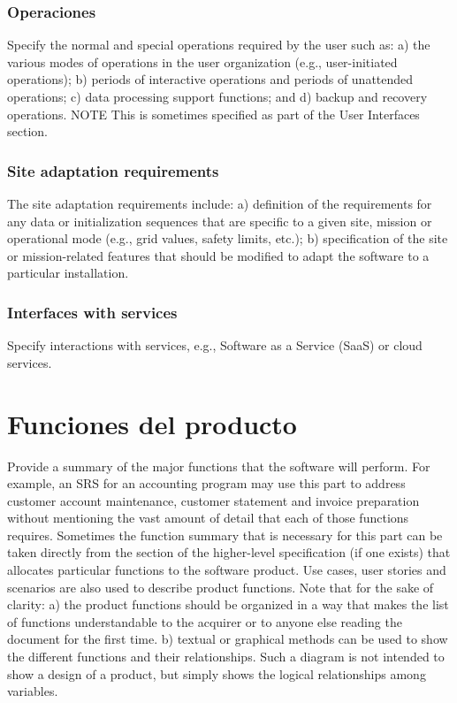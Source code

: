 \documentclass[12pt, a4paper, twoside]{article}
\begin{document}
\subsubsection{Operaciones}
Specify the normal and special operations required by the user such as:
a) the various modes of operations in the user organization (e.g., user-initiated operations);
b) periods of interactive operations and periods of unattended operations;
c) data processing support functions; and
d) backup and recovery operations.
NOTE This is sometimes specified as part of the User Interfaces section.

\subsubsection{Site adaptation requirements}
The site adaptation requirements include:
a) definition of the requirements for any data or initialization sequences that are specific to a given
site, mission or operational mode (e.g., grid values, safety limits, etc.);
b) specification of the site or mission-related features that should be modified to adapt the software
to a particular installation.

\subsubsection{Interfaces with services}
Specify interactions with services, e.g., Software as a Service (SaaS) or cloud services.


\section{Funciones del producto}
Provide a summary of the major functions that the software will perform. For example, an SRS for an
accounting program may use this part to address customer account maintenance, customer statement
and invoice preparation without mentioning the vast amount of detail that each of those functions
requires.
Sometimes the function summary that is necessary for this part can be taken directly from the section
of the higher-level specification (if one exists) that allocates particular functions to the software
product.
Use cases, user stories and scenarios are also used to describe product functions.
Note that for the sake of clarity:
a) the product functions should be organized in a way that makes the list of functions understandable
to the acquirer or to anyone else reading the document for the first time.
b) textual or graphical methods can be used to show the different functions and their relationships.
Such a diagram is not intended to show a design of a product, but simply shows the logical
relationships among variables.
\end{document}
